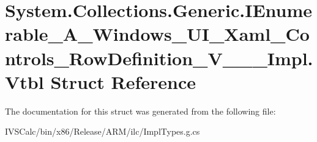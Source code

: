\hypertarget{struct_system_1_1_collections_1_1_generic_1_1_i_enumerable___a___windows___u_i___xaml___controlsa355dae40832b11aea3db729202c7443}{}\section{System.\+Collections.\+Generic.\+I\+Enumerable\+\_\+\+A\+\_\+\+Windows\+\_\+\+U\+I\+\_\+\+Xaml\+\_\+\+Controls\+\_\+\+Row\+Definition\+\_\+\+V\+\_\+\+\_\+\+\_\+\+Impl.\+Vtbl Struct Reference}
\label{struct_system_1_1_collections_1_1_generic_1_1_i_enumerable___a___windows___u_i___xaml___controlsa355dae40832b11aea3db729202c7443}


The documentation for this struct was generated from the following file\+:\begin{DoxyCompactItemize}
\item 
I\+V\+S\+Calc/bin/x86/\+Release/\+A\+R\+M/ilc/Impl\+Types.\+g.\+cs\end{DoxyCompactItemize}
